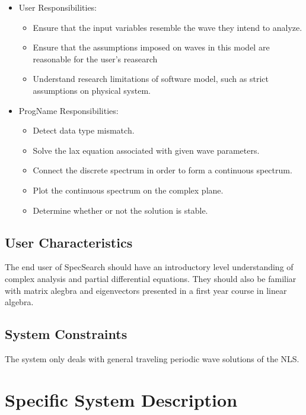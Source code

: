 \documentclass[12pt]{article}
\newcommand{\progname}{ProgName} %
\begin{document}
\begin{itemize}
\item User Responsibilities:
\begin{itemize}
\item Ensure that the input variables resemble the wave they intend to analyze.
\item Ensure that the assumptions imposed on waves in this model are reasonable 
for the user's reasearch
\item Understand research limitations of software model, such as strict 
assumptions on physical system.
\end{itemize}
\item \progname{} Responsibilities:
\begin{itemize}
\item Detect data type mismatch. 
\item Solve the lax equation associated with given wave parameters. 
\item Connect the discrete spectrum in order to form a continuous spectrum. 
\item Plot the continuous spectrum on the complex plane.
\item Determine whether or not the solution is stable. 
\end{itemize}
\end{itemize}

\subsection{User Characteristics} \label{SecUserCharacteristics}

The end user of SpecSearch should have an introductory level understanding of 
complex analysis and partial differential equations. They should also be 
familiar with matrix alegbra and eigenvectors presented in a first year course 
in linear algebra. 

\subsection{System Constraints}

The system only deals with general traveling periodic wave solutions of the 
NLS. 

\section{Specific System Description}
\end{document}
